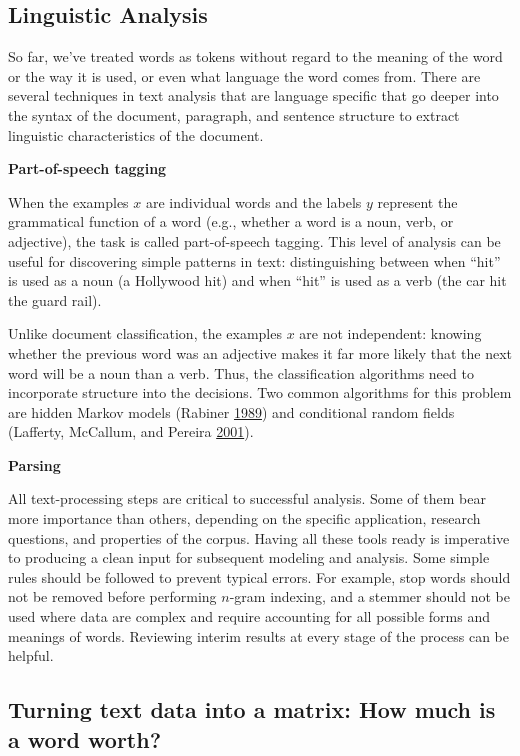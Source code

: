 \documentclass[]{krantz}
\begin{document}
\subsection{Linguistic Analysis}\label{linguistic-analysis}

So far, we've treated words as tokens without regard to the meaning of
the word or the way it is used, or even what language the word comes
from. There are several techniques in text analysis that are language
specific that go deeper into the syntax of the document, paragraph, and
sentence structure to extract linguistic characteristics of the
document.

\textbf{Part-of-speech tagging}

When the examples \(x\) are individual words and the labels \(y\)
represent the grammatical function of a word (e.g., whether a word is a
noun, verb, or adjective), the task is called part-of-speech tagging.
This level of analysis can be useful for discovering simple patterns in
text: distinguishing between when ``hit'' is used as a noun (a Hollywood
hit) and when ``hit'' is used as a verb (the car hit the guard rail).

Unlike document classification, the examples \(x\) are not independent:
knowing whether the previous word was an adjective makes it far more
likely that the next word will be a noun than a verb. Thus, the
classification algorithms need to incorporate structure into the
decisions. Two common algorithms for this problem are hidden Markov
models (Rabiner \protect\hyperlink{ref-rabiner-89}{1989}) and
conditional random fields (Lafferty, McCallum, and Pereira
\protect\hyperlink{ref-lafferty-01}{2001}).

\textbf{Parsing}

All text-processing steps are critical to successful analysis. Some of
them bear more importance than others, depending on the specific
application, research questions, and properties of the corpus. Having
all these tools ready is imperative to producing a clean input for
subsequent modeling and analysis. Some simple rules should be followed
to prevent typical errors. For example, stop words should not be removed
before performing \(n\)-gram indexing, and a stemmer should not be used
where data are complex and require accounting for all possible forms and
meanings of words. Reviewing interim results at every stage of the
process can be helpful.

\subsection{Turning text data into a matrix: How much is a word
worth?}\label{turning-text-data-into-a-matrix-how-much-is-a-word-worth}
\end{document}
